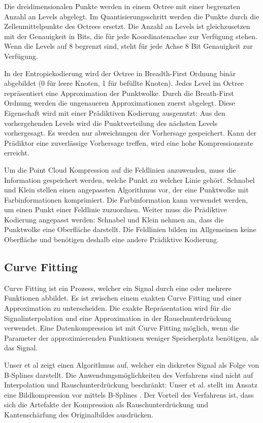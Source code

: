 Die dreidimensionalen Punkte werden in einem Octree mit einer begrenzten Anzahl an Levels abgelegt. Im Quantisierungsschritt werden die Punkte durch die Zellenmittelpunkte des Octrees ersetzt. Die Anzahl an Levels ist gleichzusetzen mit der Genauigkeit in Bits, die für jede Koordinatenachse zur Verfügung stehen. Wenn die Levels auf 8 begrenzt sind, steht für jede Achse 8 Bit Genauigkeit zur Verfügung.

In der Entropiekodierung wird der Octree in Breadth-First Ordnung binär abgebildet (0 für leere Knoten, 1 für befüllte Knoten). Jedes Level im Octree repräsentiert eine Approximation der Punktwolke. Durch  die Breath-First Ordnung werden die ungenaueren Approximationen zuerst abgelegt. Diese Eigenschaft wird mit einer Prädiktiven Kodierung ausgenutzt: Aus den vorhergehenden Levels wird die Punktverteilung des nächsten Levels vorhergesagt. Es werden nur abweichungen der Vorhersage gespeichert. Kann der Prädiktor eine zuverlässige Vorhersage treffen, wird eine hohe Kompressionsrate erreicht.

Um die Point Cloud Kompression auf die Feldlinien anzuwenden, muss die Information gespeichert werden, welche Punkt zu welcher Linie gehört. Schnabel und Klein stellen einen angepassten Algorithmus vor, der eine Punktwolke mit Farbinformationen komprimiert. Die Farbinformation kann verwendet werden, um einen Punkt einer Feldlinie zuzuordnen. Weiter muss die Prädiktive Kodierung angepasst werden: Schnabel und Klein nehmen an, dass die Punktwolke eine Oberfläche darstellt. Die Feldlinien bilden im Allgemeinen keine Oberfläche und benötigen deshalb eine andere Prädiktive Kodierung.

\subsection{Curve Fitting}
Curve Fitting ist ein Prozess, welcher ein Signal durch eine oder mehrere Funktionen abbildet. Es ist zwischen einem exakten Curve Fitting und einer Approximation zu unterscheiden. Die exakte Repräsentation wird für die Signalinterpolation und eine Approximation in der Rauschunterdrückung verwendet. Eine Datenkompression ist mit Curve Fitting möglich, wenn die Parameter der approximierenden Funktionen weniger Speicherplatz benötigen, als das Signal.

Unser et al \cite{unser1993b:spline} zeigt einen Algorithmus auf, welcher ein diskretes Signal als Folge von B-Splines darstellt. Die Anwendungsmöglichkeiten des Verfahrens sind nicht auf Interpolation und Rauschunterdrückung beschränkt: Unser et al. stellt im Ansatz eine Bildkompression vor mittels B-Splines \cite{unser1993b2:spline}. Der Vorteil des Verfahrens ist, dass sich die Artefakte der Kompression als Rauschunterdrückung und Kantenschärfung des Originalbildes ausdrücken.

